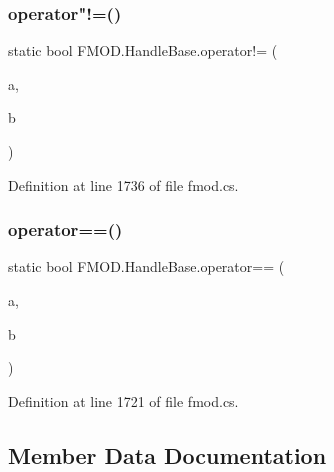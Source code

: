 \subsubsection{\texorpdfstring{operator"!=()}{operator!=()}}
{\footnotesize\ttfamily static bool F\+M\+O\+D.\+Handle\+Base.\+operator!= (\begin{DoxyParamCaption}\item[{\hyperlink{class_f_m_o_d_1_1_handle_base}{Handle\+Base}}]{a,  }\item[{\hyperlink{class_f_m_o_d_1_1_handle_base}{Handle\+Base}}]{b }\end{DoxyParamCaption})\hspace{0.3cm}{\ttfamily [static]}}



Definition at line 1736 of file fmod.\+cs.

\mbox{\label{class_f_m_o_d_1_1_handle_base_adea8f4f13062b1179b1c9cd5410cf74c}} 
\subsubsection{\texorpdfstring{operator==()}{operator==()}}
{\footnotesize\ttfamily static bool F\+M\+O\+D.\+Handle\+Base.\+operator== (\begin{DoxyParamCaption}\item[{\hyperlink{class_f_m_o_d_1_1_handle_base}{Handle\+Base}}]{a,  }\item[{\hyperlink{class_f_m_o_d_1_1_handle_base}{Handle\+Base}}]{b }\end{DoxyParamCaption})\hspace{0.3cm}{\ttfamily [static]}}



Definition at line 1721 of file fmod.\+cs.



\subsection{Member Data Documentation}
\mbox{\label{class_f_m_o_d_1_1_handle_base_a9ce67499ada6887a5ec67be555d18eed}} 
